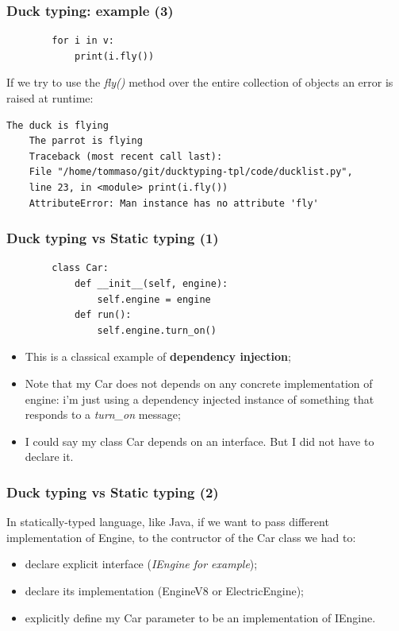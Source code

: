 \documentclass[xcolor ={table,usenames,dvipsnames}]{beamer}
\theoremstyle{definition}
\begin{document}
	\begin{frame}[fragile]
		\frametitle{Duck typing: example (3)}
		\begin{lstlisting}	
		for i in v:
			print(i.fly())
		\end{lstlisting}
		If we try to use the \textit{fly()} method  over the entire collection of objects an error is raised at runtime:
			\begin{lstlisting}[keywordstyle=\color{black},
		commentstyle=\color{black},
	stringstyle=\color{black}.]	
	The duck is flying
	The parrot is flying
	Traceback (most recent call last):
	File "/home/tommaso/git/ducktyping-tpl/code/ducklist.py", 
	line 23, in <module> print(i.fly())
	AttributeError: Man instance has no attribute 'fly'
		\end{lstlisting}
	\end{frame}

	\begin{frame}[fragile]
		\frametitle{Duck typing vs Static typing (1)}
		\begin{lstlisting}
		class Car:
			def __init__(self, engine):
				self.engine = engine
			def run():
				self.engine.turn_on()			
		\end{lstlisting}
		
		\begin{itemize}
			\item This is a classical example of \textbf{dependency injection};
			\item Note that my Car does not depends on any concrete implementation of engine: i'm just using a dependency injected instance of something that responds to a \textit{turn\_on} message;
			\item I could say my class Car depends on an interface. But I did not have to declare it. %
		\end{itemize}	
	\end{frame}
	
	\begin{frame}
		\frametitle{Duck typing vs Static typing (2)}
		In statically-typed language, like Java, if we want to pass different implementation of Engine, to the contructor of the Car class we had to:
		\begin{itemize}
			\item declare explicit interface (\textit{IEngine for example});
			\item declare its implementation (EngineV8 or ElectricEngine);
			\item explicitly define my Car parameter to be an implementation of IEngine.
		\end{itemize} 
		
	\end{frame}
	
\end{document}
